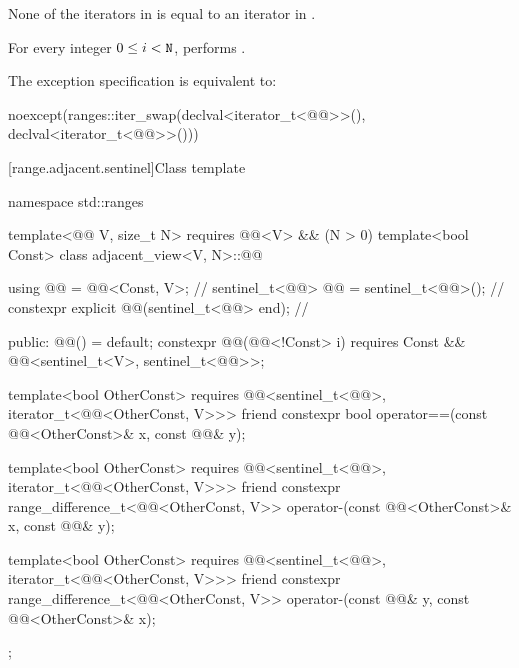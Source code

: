 \begin{itemdescr}
\pnum
\expects
None of the iterators in  is equal to
an iterator in .

\pnum
\effects
For every integer $0 \leq i < \texttt{N}$,
performs
.

\pnum
\remarks
The exception specification is equivalent to:
\begin{codeblock}
noexcept(ranges::iter_swap(declval<iterator_t<@@>>(), declval<iterator_t<@@>>()))
\end{codeblock}
\end{itemdescr}

[range.adjacent.sentinel]{Class template }

%
\begin{codeblock}
namespace std::ranges {
  template<@@ V, size_t N>
    requires @@<V> && (N > 0)
  template<bool Const>
  class adjacent_view<V, N>::@@ {
    using @@ = @@<Const, V>;                         // \expos
    sentinel_t<@@> @@ = sentinel_t<@@>();                 // \expos
    constexpr explicit @@(sentinel_t<@@> end);          // \expos

  public:
    @@() = default;
    constexpr @@(@@<!Const> i)
      requires Const && @@<sentinel_t<V>, sentinel_t<@@>>;

    template<bool OtherConst>
      requires @@<sentinel_t<@@>, iterator_t<@@<OtherConst, V>>>
    friend constexpr bool operator==(const @@<OtherConst>& x, const @@& y);

    template<bool OtherConst>
      requires @@<sentinel_t<@@>, iterator_t<@@<OtherConst, V>>>
    friend constexpr range_difference_t<@@<OtherConst, V>>
      operator-(const @@<OtherConst>& x, const @@& y);

    template<bool OtherConst>
      requires @@<sentinel_t<@@>, iterator_t<@@<OtherConst, V>>>
    friend constexpr range_difference_t<@@<OtherConst, V>>
      operator-(const @@& y, const @@<OtherConst>& x);
  };
}
\end{codeblock}

